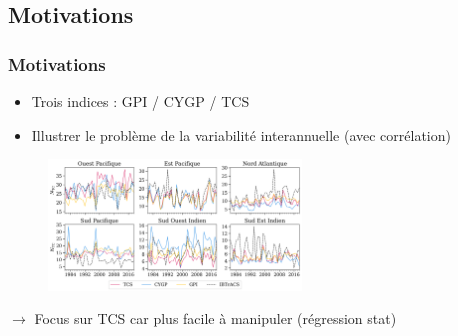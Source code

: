 \documentclass[aspectratio=169, usepdftitle=false, xcolor={dvipsnames}, 9pt,table]{beamer}
\begin{document}
\subsection*{Motivations}
\begin{frame}
    \frametitle{Motivations}
    \begin{itemize}
        \item Trois indices : GPI / CYGP / TCS
        \item Illustrer le problème de la variabilité interannuelle (avec corrélation)
    \end{itemize} 
    \begin{figure}
        \centering
        \includegraphics[width=0.6\textwidth]{Figures/tcs_cygp_gpi_interannual.png}
    \end{figure}
    $\longrightarrow$ Focus sur TCS car plus facile à manipuler (régression stat)
\end{frame}

\end{document}
